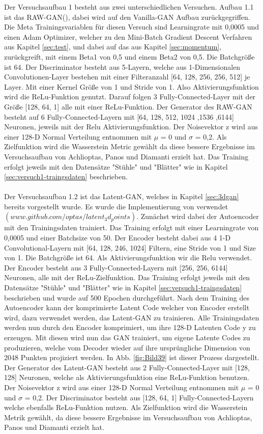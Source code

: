 \documentclass{llncs}
\begin{document}
Der Versuchsaufbau 1 besteht aus zwei unterschiedlichen Versuchen. Aufbau 1.1 ist das RAW-GAN(\cite{3dgan}), dabei wird auf den Vanilla-GAN Aufbau zurückgegriffen. Die Meta Trainingsvariablen für diesen Versuch sind Learningrate mit 0,0005 und einen Adam Optimizer, welcher zu den Mini-Batch Gradient Descent Verfahren aus Kapitel \ref{sec:test}, und dabei auf das aus Kapitel \ref{sec:momentum}, zurückgreift, mit einem Beta1 von 0,5 und einem Beta2 von 0,5. Die Batchgröße ist 64. Der Discriminator besteht aus 5-Layern, welche aus 1-Dimensionalen Convolutionen-Layer bestehen mit einer Filteranzahl [64, 128, 256, 256, 512] je Layer. Mit einer Kernel Größe von 1 und Stride von 1. Also Aktivierungsfunktion wird die ReLu-Funktion genutzt. Darauf folgen 3 Fully-Connected-Layer mit der Größe [128, 64, 1] alle mit einer ReLu-Funktion. Der Generator des RAW-GAN besteht auf 6 Fully-Connected-Layern mit [64, 128, 512, 1024 ,1536 ,6144] Neuronen, jeweils mit der Relu Aktivierungsfunktion. Der Noisevektor z wird aus einer 128-D Normal Verteilung entnommen mit $\mu$ = 0 und $\sigma$ =  0,2. Als Zielfunktion wird die Wasserstein Metric gewählt da diese bessere Ergebnisse im Versuchsaufbau von Achlioptas, Panos und Diamanti\cite{3dgan} erzielt hat. Das Training erfolgt jeweils mit den Datensätze "Stühle" und "Blätter" wie in Kapitel \ref{sec:versuch1-traingsdaten} beschrieben.
\\\\
Der Versuchsaufbau 1.2 ist das Latent-GAN, welches in Kapitel \ref{sec:3dgan} bereits vorgestellt wurde. Es wurde die Implementierung von \cite{3dgan} verwendet $(www.github.com/optas/latent_3d_points)$. Zunächst wird dabei der Autoencoder mit den Trainingsdaten trainiert. Das Training erfolgt mit einer Learningrate von 0,0005 und einer Batchsize von 50. Der Encoder besteht dabei aus 4 1-D Convolutional-Layern mit [64, 128, 246, 1024] Filtern, eine Stride von 1 und Size von 1. Die Batchgröße ist 64. Als Aktivierungsfunktion wir die Relu verwendet. Der Encoder besteht aus 3 Fully-Connected-Layern mit [256, 256, 6144] Neuronen, alle mit der ReLu-Zielfunktion. Das Training erfolgt jeweils mit den Datensätze "Stühle" und "Blätter" wie in Kapitel \ref{sec:versuch1-traingsdaten} beschrieben und wurde auf 500 Epochen durchgeführt. Nach dem Training des Autoencoder kann der komprimierte Latent Code welcher von Encoder erstellt wird, dazu verwendet werden, das Latent-GAN zu trainieren. Alle Trainingsdaten werden nun durch den Encoder komprimiert, um ihre 128-D Latenten Code y zu erzeugen. Mit diesen wird nun das GAN trainiert, um eigene Latente Codes zu produzieren, welche vom Decoder wieder auf ihre ursprüngliche Dimension von 2048 Punkten projiziert werden. In Abb. \ref{fig:Bild39} ist dieser Prozess dargestellt. Der Generator des Latent-GAN besteht aus 2 Fully-Connected-Layer mit [128, 128] Neuronen, welche als Aktivierungsfunktion eine ReLu-Funktion benutzen. Der Noisevektor z wird aus einer 128-D Normal Verteilung entnommen mit $\mu$ = 0 und $\sigma$ =  0,2. Der Discriminator besteht aus [128, 64, 1] Fully-Connected-Layern welche ebenfalls ReLu-Funktion nutzen. Als Zielfunktion wird die Wasserstein Metrik gewählt, da diese bessere Ergebnisse im Versuchsaufbau von Achlioptas, Panos und Diamanti\cite{3dgan} erzielt hat. 
\end{document}
